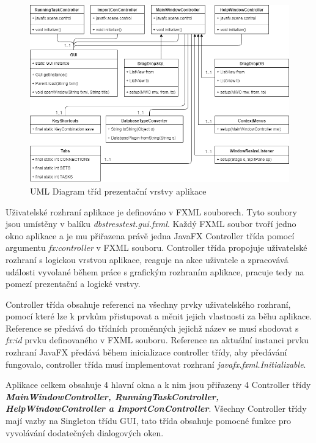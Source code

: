 \documentclass[czech,bachelor,public,dept460,male,cpdeclaration,twoside]{diploma}
\begin{document}
\begin{figure}[!htbp]\centering\includegraphics[width=1.0\textwidth]{Figures/presentlayer.png}\caption{UML Diagram tříd prezentační vrstvy aplikace}
\end{figure}

Uživatelské rozhraní aplikace je definováno v FXML souborech. Tyto soubory jsou umístěny v balíku \textit{dbstresstest.gui.fxml}. Každý FXML soubor tvoří jedno okno aplikace a je mu přiřazena právě jedna JavaFX Controller třída pomocí argumentu \textit{fx:controller} v FXML souboru. Controller třída propojuje uživatelské rozhraní s logickou vrstvou aplikace, reaguje na akce uživatele a zpracovává události vyvolané během práce s grafickým rozhraním aplikace, pracuje tedy na pomezí prezentační a logické vrstvy.

Controller třída obsahuje referenci na všechny prvky uživatelského rozhraní, pomocí které lze k prvkům přistupovat a měnit jejich vlastnosti za běhu aplikace. Reference se předává do třídních proměnných jejichž název se musí shodovat s \textit{fx:id} prvku definovaného v FXML souboru. Reference na aktuální instanci prvku rozhraní JavaFX předává během inicializace controller třídy, aby předávání fungovalo, controller třída musí implementovat rozhraní \textit{javafx.fxml.Initializable}.

Aplikace celkem obsahuje 4 hlavní okna a k nim jsou přiřazeny 4 Controller třídy \newline \textbf{\emph{MainWindowController, RunningTaskController, HelpWindowController a ImportConController}}. Všechny Controller třídy mají vazby na Singleton třídu GUI, tato třída obsahuje pomocné funkce pro vyvolávání dodatečných dialogových oken. 
\end{document}
